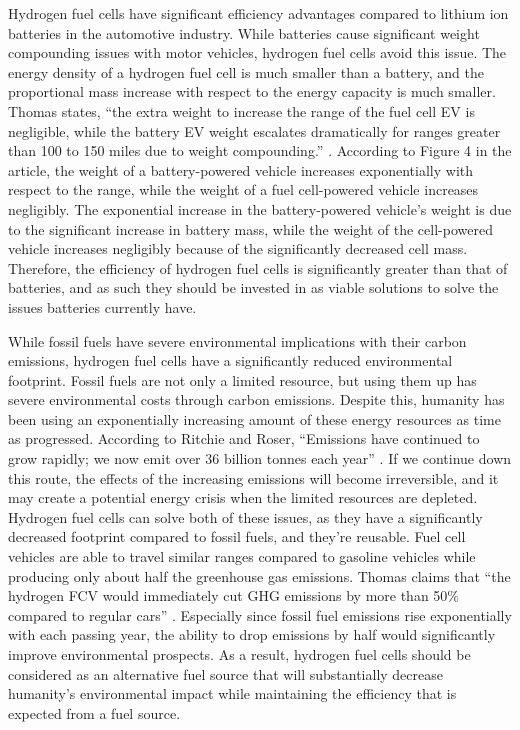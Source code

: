\documentclass[stu]{apa7}
\begin{document}
    
    Hydrogen fuel cells have significant efficiency advantages compared to lithium ion batteries
    in the automotive industry.  While batteries cause significant weight compounding issues with
    motor vehicles, hydrogen fuel cells avoid this issue.  The energy density of a hydrogen fuel
    cell is much smaller than a battery, and the proportional mass increase with respect to the
    energy capacity is much smaller.  Thomas states, ``the extra weight to increase the range of
    the fuel cell EV is negligible, while the battery EV weight escalates dramatically for ranges
    greater than 100 to 150 miles due to weight compounding.'' \parencite{thomas2009comparison}.
    According to Figure 4 in the article, the weight of a battery-powered vehicle increases
    exponentially with respect to the range, while the weight of a fuel cell-powered vehicle
    increases negligibly.  The exponential increase in the battery-powered vehicle's weight is
    due to the significant increase in battery mass, while the weight of the cell-powered vehicle
    increases negligibly because of the significantly decreased cell mass.  Therefore, the
    efficiency of hydrogen fuel cells is significantly greater than that of batteries, and
    as such they should be invested in as viable solutions to solve the issues batteries
    currently have.
    
    
    While fossil fuels have severe environmental implications with their carbon emissions, hydrogen
    fuel cells have a significantly reduced environmental footprint.  Fossil fuels are not only a
    limited resource, but using them up has severe environmental costs through carbon emissions.
    Despite this, humanity has been using an exponentially increasing amount of these energy
    resources as time as progressed.  According to Ritchie and Roser, ``Emissions have continued to
    grow rapidly; we now emit over 36 billion tonnes each year'' \parencite{ritchie2020emissions}.
    If we continue down this route, the effects of the increasing emissions will become
    irreversible, and it may create a potential energy crisis when the limited resources are
    depleted.  Hydrogen fuel cells can solve both of these issues, as they have a significantly
    decreased footprint compared to fossil fuels, and they're reusable. Fuel cell vehicles are able
    to travel similar ranges compared to gasoline vehicles while producing only about half the
    greenhouse gas emissions. Thomas claims that ``the hydrogen FCV would immediately cut GHG
    emissions by more than 50\% compared to regular cars'' \parencite{thomas2009comparison}.
    Especially since fossil fuel emissions rise exponentially with each passing year, the ability
    to drop emissions by half would significantly improve environmental prospects.  As a result,
    hydrogen fuel cells should be considered as an alternative fuel source that will
    substantially decrease humanity's environmental impact while maintaining the efficiency
    that is expected from a fuel source. 
    
\end{document}
